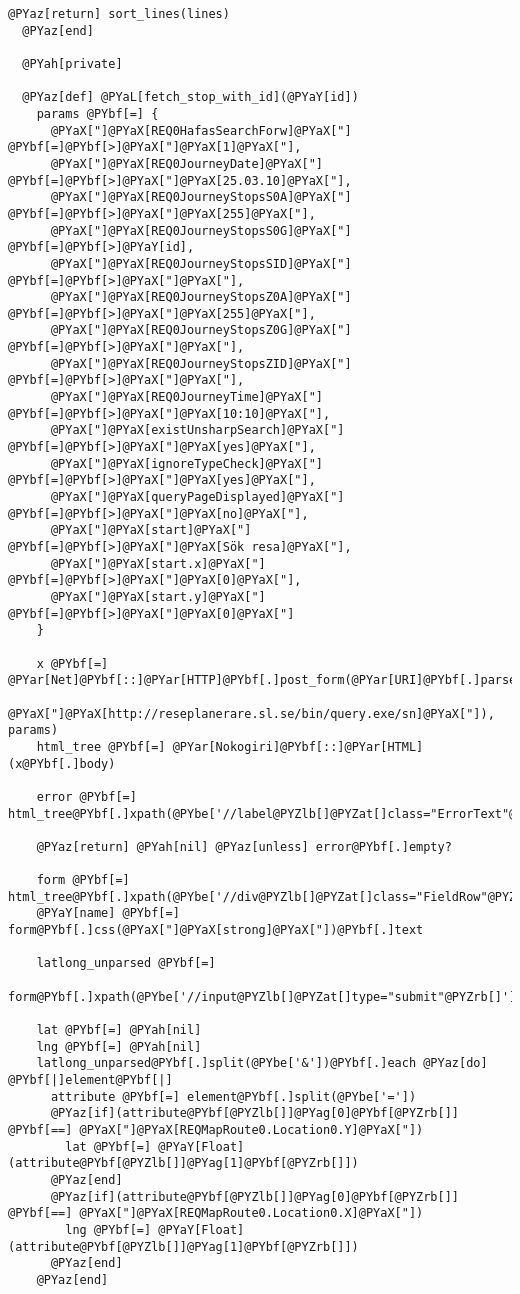 \begin{Verbatim}[commandchars=@\[\]]
    @PYaz[return] sort_lines(lines)
  @PYaz[end]
  
  @PYah[private]
  
  @PYaz[def] @PYaL[fetch_stop_with_id](@PYaY[id])
    params @PYbf[=] {
      @PYaX["]@PYaX[REQ0HafasSearchForw]@PYaX["] @PYbf[=]@PYbf[>]@PYaX["]@PYaX[1]@PYaX["],
      @PYaX["]@PYaX[REQ0JourneyDate]@PYaX["]     @PYbf[=]@PYbf[>]@PYaX["]@PYaX[25.03.10]@PYaX["],
      @PYaX["]@PYaX[REQ0JourneyStopsS0A]@PYaX["] @PYbf[=]@PYbf[>]@PYaX["]@PYaX[255]@PYaX["],
      @PYaX["]@PYaX[REQ0JourneyStopsS0G]@PYaX["] @PYbf[=]@PYbf[>]@PYaY[id],
      @PYaX["]@PYaX[REQ0JourneyStopsSID]@PYaX["] @PYbf[=]@PYbf[>]@PYaX["]@PYaX["],
      @PYaX["]@PYaX[REQ0JourneyStopsZ0A]@PYaX["] @PYbf[=]@PYbf[>]@PYaX["]@PYaX[255]@PYaX["],
      @PYaX["]@PYaX[REQ0JourneyStopsZ0G]@PYaX["] @PYbf[=]@PYbf[>]@PYaX["]@PYaX["],
      @PYaX["]@PYaX[REQ0JourneyStopsZID]@PYaX["] @PYbf[=]@PYbf[>]@PYaX["]@PYaX["],
      @PYaX["]@PYaX[REQ0JourneyTime]@PYaX["]     @PYbf[=]@PYbf[>]@PYaX["]@PYaX[10:10]@PYaX["],
      @PYaX["]@PYaX[existUnsharpSearch]@PYaX["]  @PYbf[=]@PYbf[>]@PYaX["]@PYaX[yes]@PYaX["],
      @PYaX["]@PYaX[ignoreTypeCheck]@PYaX["]     @PYbf[=]@PYbf[>]@PYaX["]@PYaX[yes]@PYaX["],
      @PYaX["]@PYaX[queryPageDisplayed]@PYaX["]  @PYbf[=]@PYbf[>]@PYaX["]@PYaX[no]@PYaX["],
      @PYaX["]@PYaX[start]@PYaX["]               @PYbf[=]@PYbf[>]@PYaX["]@PYaX[Sök resa]@PYaX["],
      @PYaX["]@PYaX[start.x]@PYaX["]             @PYbf[=]@PYbf[>]@PYaX["]@PYaX[0]@PYaX["],
      @PYaX["]@PYaX[start.y]@PYaX["]             @PYbf[=]@PYbf[>]@PYaX["]@PYaX[0]@PYaX["]
    }

    x @PYbf[=] @PYar[Net]@PYbf[::]@PYar[HTTP]@PYbf[.]post_form(@PYar[URI]@PYbf[.]parse(
      @PYaX["]@PYaX[http://reseplanerare.sl.se/bin/query.exe/sn]@PYaX["]), params)
    html_tree @PYbf[=] @PYar[Nokogiri]@PYbf[::]@PYar[HTML](x@PYbf[.]body)

    error @PYbf[=] html_tree@PYbf[.]xpath(@PYbe['//label@PYZlb[]@PYZat[]class="ErrorText"@PYZrb[]'])

    @PYaz[return] @PYah[nil] @PYaz[unless] error@PYbf[.]empty?

    form @PYbf[=] html_tree@PYbf[.]xpath(@PYbe['//div@PYZlb[]@PYZat[]class="FieldRow"@PYZrb[]'])@PYbf[.]first
    @PYaY[name] @PYbf[=] form@PYbf[.]css(@PYaX["]@PYaX[strong]@PYaX["])@PYbf[.]text

    latlong_unparsed @PYbf[=]
      form@PYbf[.]xpath(@PYbe['//input@PYZlb[]@PYZat[]type="submit"@PYZrb[]'])@PYbf[.]attribute(@PYaX["]@PYaX[name]@PYaX["])@PYbf[.]value

    lat @PYbf[=] @PYah[nil]
    lng @PYbf[=] @PYah[nil]
    latlong_unparsed@PYbf[.]split(@PYbe['&'])@PYbf[.]each @PYaz[do] @PYbf[|]element@PYbf[|]
      attribute @PYbf[=] element@PYbf[.]split(@PYbe['='])
      @PYaz[if](attribute@PYbf[@PYZlb[]]@PYag[0]@PYbf[@PYZrb[]] @PYbf[==] @PYaX["]@PYaX[REQMapRoute0.Location0.Y]@PYaX["])
        lat @PYbf[=] @PYaY[Float](attribute@PYbf[@PYZlb[]]@PYag[1]@PYbf[@PYZrb[]])
      @PYaz[end]
      @PYaz[if](attribute@PYbf[@PYZlb[]]@PYag[0]@PYbf[@PYZrb[]] @PYbf[==] @PYaX["]@PYaX[REQMapRoute0.Location0.X]@PYaX["])
        lng @PYbf[=] @PYaY[Float](attribute@PYbf[@PYZlb[]]@PYag[1]@PYbf[@PYZrb[]])
      @PYaz[end]
    @PYaz[end]


\end{Verbatim}
